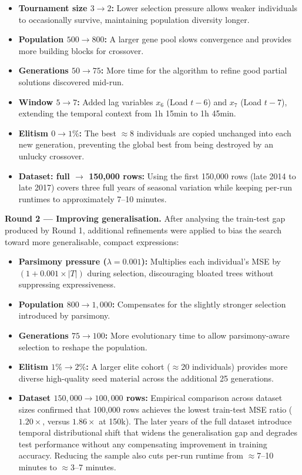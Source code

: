 \documentclass[12pt,a4paper]{article}
\begin{document}
\begin{itemize}
    \item \textbf{Tournament size $3 \to 2$:} Lower selection pressure allows weaker individuals to occasionally survive, maintaining population diversity longer.
    \item \textbf{Population $500 \to 800$:} A larger gene pool slows convergence and provides more building blocks for crossover.
    \item \textbf{Generations $50 \to 75$:} More time for the algorithm to refine good partial solutions discovered mid-run.
    \item \textbf{Window $5 \to 7$:} Added lag variables $x_6$ (Load $t{-}6$) and $x_7$ (Load $t{-}7$), extending the temporal context from 1h 15min to 1h 45min.
    \item \textbf{Elitism $0 \to 1\%$:} The best $\approx$8 individuals are copied unchanged into each new generation, preventing the global best from being destroyed by an unlucky crossover.
    \item \textbf{Dataset: full $\to$ 150,000 rows:} Using the first 150,000 rows (late 2014 to late 2017) covers three full years of seasonal variation while keeping per-run runtimes to approximately 7--10 minutes.
\end{itemize}

\textbf{Round 2 --- Improving generalisation.}
After analysing the train-test gap produced by Round 1, additional refinements were applied to bias the search toward more generalisable, compact expressions:

\begin{itemize}
    \item \textbf{Parsimony pressure ($\lambda = 0.001$):} Multiplies each individual's MSE by $(1 + 0.001 \times |T|)$ during selection, discouraging bloated trees without suppressing expressiveness.
    \item \textbf{Population $800 \to 1{,}000$:} Compensates for the slightly stronger selection introduced by parsimony.
    \item \textbf{Generations $75 \to 100$:} More evolutionary time to allow parsimony-aware selection to reshape the population.
    \item \textbf{Elitism $1\% \to 2\%$:} A larger elite cohort ($\approx$20 individuals) provides more diverse high-quality seed material across the additional 25 generations.
    \item \textbf{Dataset $150{,}000 \to 100{,}000$ rows:} Empirical comparison across dataset sizes confirmed that 100,000 rows achieves the lowest train-test MSE ratio ($1.20\times$, versus $1.86\times$ at 150k). The later years of the full dataset introduce temporal distributional shift that widens the generalisation gap and degrades test performance without any compensating improvement in training accuracy. Reducing the sample also cuts per-run runtime from $\approx$7--10 minutes to $\approx$3--7 minutes.
\end{itemize}
\end{document}
